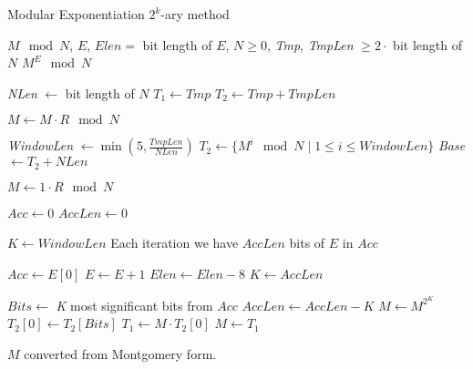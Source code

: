 \documentclass[a4paper,8pt]{article}
\begin{document}
\begin{algorithm}
\caption{Modular Exponentiation $2^k$-ary method}\label{alg:cap}
\begin{algorithmic}
\Require $M \mod N$, $E$, $Elen =$ bit length of $E$, $N \geq 0$, \textit{Tmp}, \textit{TmpLen} $\geq 2 \cdot$ bit length of $N$
\Ensure $M^E \mod N$

\State \textit{NLen} $\gets$ bit length of $N$
\State $T_1 \gets \textit{Tmp}$
\State $T_2 \gets \textit{Tmp} + \textit{TmpLen}$

\State $M \gets M \cdot R \mod N$ 

\State \textit{WindowLen} $\gets \min(5, \frac{\textit{TmpLen}}{\textit{NLen}})$
\State $T_2 \gets \{ M^i \mod N \mid 1 \leq i \leq \textit{WindowLen} \}$
\State \textit{Base} $\gets T_2 + \textit{NLen}$ 

\State $M \gets 1 \cdot R \mod N$ 

\State $Acc \gets 0$
\State $AccLen \gets 0$

    \State $K \gets \textit{WindowLen}$
    \State Each iteration we have $AccLen$ bits of $E$ in $Acc$

            \State $Acc \gets E[0]$ 
            \State $E \gets E + 1$
            \State $Elen \gets Elen - 8$
        \Else
            \State $K \gets AccLen$ 
        \EndIf
    \EndIf

    \State $Bits \gets$ \textit{K} most significant bits from $Acc$
    \State $AccLen \gets AccLen - K$
    \State $M \gets M^{2^K}$
    \State $T_2[0] \gets T_2[Bits]$ 
    \EndIf
    \State $T_1 \gets M \cdot T_2[0]$
    \State $M \gets T_1$ 
\EndWhile

\State \Return $M$ converted from Montgomery form.

\end{algorithmic}
\end{algorithm}
\end{document}
